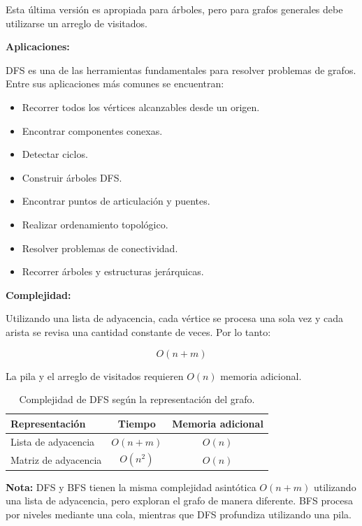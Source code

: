 \documentclass[10pt,a4paper,twocolumn]{article}
\begin{document}
Esta última versión es apropiada para árboles, pero para grafos
generales debe utilizarse un arreglo de visitados.

\textbf{Aplicaciones:}

DFS es una de las herramientas fundamentales para resolver problemas
de grafos. Entre sus aplicaciones más comunes se encuentran:

\begin{itemize}
    \item Recorrer todos los vértices alcanzables desde un origen.
    \item Encontrar componentes conexas.
    \item Detectar ciclos.
    \item Construir árboles DFS.
    \item Encontrar puntos de articulación y puentes.
    \item Realizar ordenamiento topológico.
    \item Resolver problemas de conectividad.
    \item Recorrer árboles y estructuras jerárquicas.
\end{itemize}

\textbf{Complejidad:}

Utilizando una lista de adyacencia, cada vértice se procesa una sola
vez y cada arista se revisa una cantidad constante de veces. Por lo
tanto:

\[
O(n+m)
\]

La pila y el arreglo de visitados requieren $O(n)$ memoria adicional.

\begin{table}[H]
\raggedright
\scriptsize
\setlength{\tabcolsep}{3pt}
\renewcommand{\arraystretch}{1.1}
\begin{tabular}{|l|c|c|}
\hline
\textbf{Representación} &
\textbf{Tiempo} &
\textbf{Memoria adicional} \\
\hline
Lista de adyacencia &
$O(n+m)$ &
$O(n)$ \\
\hline
Matriz de adyacencia &
$O(n^2)$ &
$O(n)$ \\
\hline
\end{tabular}
\caption{Complejidad de DFS según la representación del grafo.}
\end{table}

\textbf{Nota:} DFS y BFS tienen la misma complejidad asintótica
$O(n+m)$ utilizando una lista de adyacencia, pero exploran el grafo de
manera diferente. BFS procesa por niveles mediante una cola, mientras
que DFS profundiza utilizando una pila.
\end{document}
